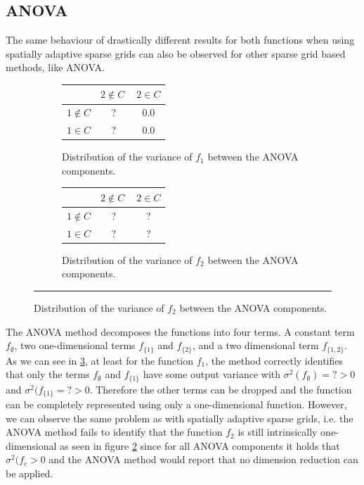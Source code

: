 \documentclass[
  a4paper,  %
  twoside,  %
  bibliography=totoc,
  headsepline,
  cleardoublepage=empty,
  parskip=half,
  draft=false
]{scrbook}
\newcommand{\delimit}{{\color{charcoal}\noindent\rule{\textwidth}{1pt}}}
\begin{document}
\subsection{ANOVA}


The same behaviour of drastically different results for both functions when using spatially adaptive sparse grids can also be observed for other sparse grid based methods, like ANOVA.


\begin{mdframed}[style=style]
\vspace{2.5mm}
\begin{figure}[H]
\begin{subfigure}{.50\textwidth}
  \centering
  \begin{tabular}{ l c c }
\hline \hline
& $2 \notin C~$ & $2 \in C$ \\
\hline
$1 \notin C$ & ? & 0.0\\
$1 \in C$ & ? & 0.0\\
\end{tabular}
  \caption{Distribution of the variance of $f_1$ between the ANOVA components.}
  \label{fig:anova_f1}
\end{subfigure}
\begin{subfigure}{.49\textwidth}
  \centering
  \begin{tabular}{ l c c }
\hline \hline
& $2 \notin C~$ & $2 \in C$ \\
\hline
$1 \notin C$ & ? & ?\\
$1 \in C$ & ? & ?\\
\end{tabular}
  \caption{Distribution of the variance of $f_2$ between the ANOVA components.}
  \label{fig:anova_f2}
\end{subfigure}
\delimit
{}
\label{fig:anova}
\end{figure}
\end{mdframed}


The ANOVA method decomposes the functions into four terms.
A constant term $f_\emptyset$, two one-dimensional terms $f_{\{1\}}$ and $f_{\{2\}}$, and a two dimensional term $f_{\{1,2\}}$.
As we can see in \cref{fig:anova}, at least for the function $f_1$, the method correctly identifies that only the terms $f_\emptyset$ and $f_{\{1\}}$ have some output variance with $\sigma^2(f_\emptyset)=? > 0$ and $\sigma^2(f_{\{1\}}=? > 0$.
Therefore the other terms can be dropped and the function can be completely represented using only a one-dimensional function.
However, we can observe the same problem as with spatially adaptive sparse grids, i.e. the ANOVA method fails to identify that the function $f_2$ is still intrinsically one-dimensional as seen in figure \cref{fig:anova_f2} since for all ANOVA components it holds that $\sigma^2(f_{c}> 0$ and the ANOVA method would report that no dimension reduction can be applied.
\end{document}
